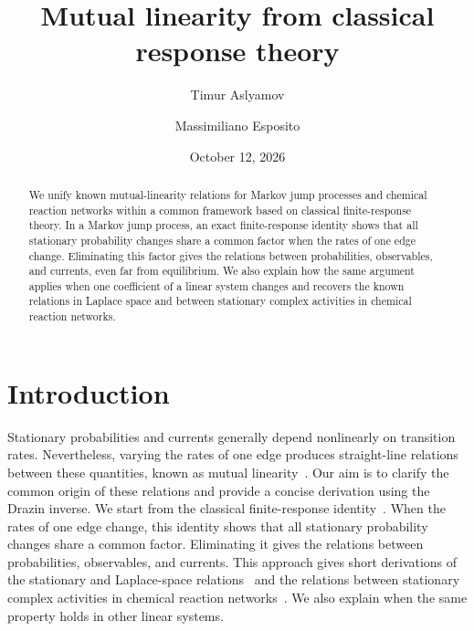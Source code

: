 \documentclass[
  reprint,
  superscriptaddress,
  amsmath,
  amssymb,
  aps,
  pre,
  longbibliography
]{revtex4-2}
\begin{document}
\title{Mutual linearity from classical response theory}

\author{Timur Aslyamov}

\author{Massimiliano Esposito}

\date{October 12, 2026}


\begin{abstract}
We unify known mutual-linearity relations for Markov jump processes
and chemical reaction networks within a common framework based on
classical finite-response theory. In a Markov jump process, an exact finite-response
identity shows that all stationary probability changes share a common
factor when the rates of one edge change. Eliminating this
factor gives the relations between probabilities, observables, and
currents, even far from equilibrium. We also explain how the same
argument applies when one coefficient of a linear system changes and
recovers the known relations in Laplace space and between stationary
complex activities in chemical reaction networks.
\end{abstract}
\maketitle

\section{Introduction}
\label{sec:introduction}

Stationary probabilities and currents generally depend nonlinearly on
transition rates. Nevertheless, varying the rates of one edge produces
straight-line relations between these quantities, known as mutual
linearity~\cite{Harunari2024,Khodabandehlou2025,DalCengio2025,Polettini2026Coplanarity,BebonSpeck2026,ZhengLu2026,VoitsSchwarz2026}.
Our aim is to clarify the common origin of these relations and provide
a concise derivation using the Drazin inverse. We start from the
classical finite-response identity~\cite{Schweitzer1968,Meyer1980}.
When the rates of one edge change, this identity shows that all
stationary probability changes share a common factor.
Eliminating it gives the relations between probabilities,
observables, and currents. This approach gives short derivations of
the stationary and Laplace-space
relations~\cite{Harunari2024,ZhengLu2026,VoitsSchwarz2026} and the
relations between stationary complex activities in chemical reaction
networks~\cite{HarunariFiusaPolettini2026}. We also explain when the
same property holds in other linear systems.
\end{document}
